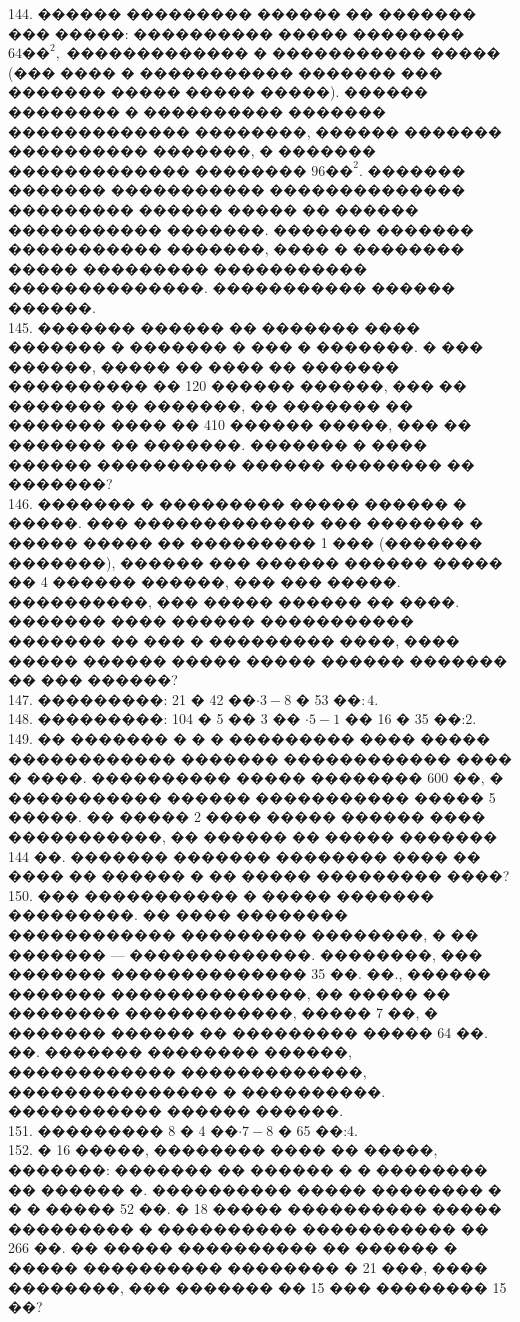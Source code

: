 \documentclass[12pt]{article}
\begin{document}
144. ������ ��������� ������ �� ������� ��� �����: ���������� ����� �������� $64\text{��}^2,$ ������������� � ����������� ����� (��� ���� � ����������� ������� ��� ������� ����� ����� �����). ������ �������� � ���������� ������� ������������� ��������, ������ ������� ���������� �������, � ������� ������������� �������� $96\text{��}^2.$ ������� ������� ����������� �������������� ��������� ������ ����� �� ������ ����������� �������. ������� ������� ����������� �������, ���� � �������� ����� ��������� ����������� ��������������. ����������� ������ ������.\\
145. ������� ������ �� ������� ���� ������� � ������� � ��� � �������. � ��� ������, ����� �� ���� �� ������� ���������� �� 120 ������ ������, ��� �� ������� �� �������, �� ������� �� ������� ���� �� 410 ������ �����, ��� �� ������� �� �������. ������� � ���� ������ ���������� ������ �������� �� �������?\\
146. ������� � ��������� ����� ������ � �����. ��� ������������� ��� ������� � ����� ����� �� ��������� 1 ��� (������� �������), ������ ��� ������ ������ ����� �� 4 ������ ������, ��� ��� �����. ����������, ��� ����� ������ �� ����. ������� ���� ������ ����������� ������� �� ��� � ��������� ����, ���� ����� ������ ����� ����� ������ ������� �� ��� ������?\\
147. ���������: 21 � 42 ��$\cdot3-8$ � 53 ��$:4.$\\
148. ���������: 104 � 5 �� 3 �� $\cdot 5-1$ �� 16 � 35 ��:2.\\
149. �� ������� � � � ��������� ���� ����� ������������ ������� ������������ ���� � ����. ���������� ����� �������� 600 ��, � ����������� ������ ����������� ����� 5 �����. �� ����� 2 ���� ����� ������ ���� �����������, �� ������ �� ����� ������� 144 ��. ������� ������� �������� ���� �� ���� �� ������ � �� ����� ��������� ����?\\
150. ��� ����������� � ����� ������� ���������. �� ���� �������� ������������ ��������� ��������, � �� ������� --- �������������. ��������, ��� ������� �������������� 35 ��. ��., ������ ������� ��������������, �� ����� �� �������� ������������, ����� 7 ��, � ������� ������ �� ��������� ����� 64 ��. ��. ������� �������� ������, ������������ �������������, ��������������� � ����������. ����������� ������ ������.\\
151. ��������� 8 � 4 ��$\cdot7-8$ � 65 ��:4.\\
152. � 16 �����, �������� ���� �� �����, �������: ������� �� ������ � � �������� �� ������ �. ���������� ����� �������� � � � ����� 52 ��. � 18 ����� ���������� ����� ��������� � ���������� ����������� �� 266 ��. �� ����� ���������� �� ������ � ����� ���������� �������� � 21 ���, ���� ��������, ��� ������� �� 15 ��� �������� 15 ��?\\
\end{document}
